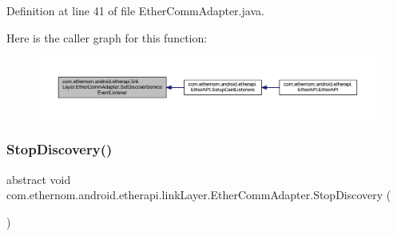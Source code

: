 Definition at line 41 of file Ether\+Comm\+Adapter.\+java.

Here is the caller graph for this function\+:\nopagebreak
\begin{figure}[H]
\begin{center}
\leavevmode
\includegraphics[width=350pt]{classcom_1_1ethernom_1_1android_1_1etherapi_1_1link_layer_1_1_ether_comm_adapter_a57af184b11f4ccd518e6abcea71438fd_icgraph}
\end{center}
\end{figure}
\mbox{\label{classcom_1_1ethernom_1_1android_1_1etherapi_1_1link_layer_1_1_ether_comm_adapter_acca97182df90976a030684b62c871131}} 
\subsubsection{\texorpdfstring{Stop\+Discovery()}{StopDiscovery()}}
{\footnotesize\ttfamily abstract void com.\+ethernom.\+android.\+etherapi.\+link\+Layer.\+Ether\+Comm\+Adapter.\+Stop\+Discovery (\begin{DoxyParamCaption}{ }\end{DoxyParamCaption})\hspace{0.3cm}{\ttfamily [abstract]}}

